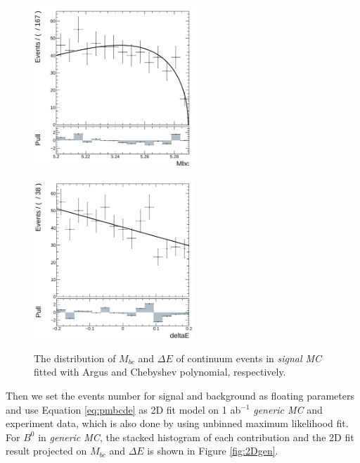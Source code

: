 \begin{figure}[htbp]
	\begin{minipage}[b]{0.5\linewidth}
		\centering 
		\includegraphics[height=6cm]{figures/mbc-cs-hist}
		\label{}
	\end{minipage}
	\begin{minipage}[b]{0.5\linewidth}
		\centering 
		\includegraphics[height=6cm]{figures/dE-cs-hist}
		\label{}
	\end{minipage}
	\caption{The distribution of $M_{bc}$ and $\Delta E$ of continuum events in \textit{signal MC} fitted with Argus and Chebyshev polynomial, respectively.}
	\label{fig:bkgmbcde}
\end{figure}
Then we set the events number for signal and background as floating parameters and use Equation \ref{eq:pmbcde} as 2D fit model on 1 ab$^{-1}$ \textit{generic MC} and experiment data, which is also done by using unbinned maximum likelihood fit.
For $B^0$ in \textit{generic MC}, the stacked histogram of each contribution and the 2D fit result projected on $M_{bc}$ and $\Delta E$ is shown in Figure \ref{fig:2Dgen}.
